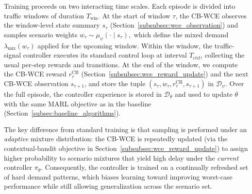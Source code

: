 \documentclass[lettersize,journal]{IEEEtran}
\begin{document}
Training proceeds on two interacting time scales. Each episode is divided into traffic windows of duration $T_{\mathrm{win}}$. At the start of window $\tau$, the CB-WCE observes the window-level state summary $s_\tau$ (Section~\ref{subsubsec:wce_observation}) and samples scenario weights
\(
w_\tau \sim \mu_{\psi}(\cdot \mid s_\tau),
\)
which define the mixed demand $\lambda_{\mathrm{mix}}(w_\tau)$ applied for the upcoming window. Within the window, the traffic-signal controller executes its standard control loop at interval $T_{\mathrm{ctrl}}$, collecting the usual per-step rewards and transitions. At the end of the window, we compute the CB-WCE reward $r^{\mathrm{CB}}_\tau$ (Section~\ref{subsubsec:wce_reward_update}) and the next CB-WCE observation $s_{\tau+1}$, and store the tuple $(s_\tau, w_\tau, r^{\mathrm{CB}}_\tau, s_{\tau+1})$ in $\mathcal{D}_\psi$. Over the full episode, the controller experience is stored in $\mathcal{D}_\theta$ and used to update $\theta$ with the same MARL objective as in the baseline (Section~\ref{subsec:baseline_algorithms}).

The key difference from standard training is that sampling is performed under an \emph{adaptive} mixture distribution: the CB-WCE is repeatedly updated (via the contextual-bandit objective in Section~\ref{subsubsec:wce_reward_update}) to assign higher probability to scenario mixtures that yield high delay under the \emph{current} controller $\pi_\theta$. Consequently, the controller is trained on a continually refreshed set of hard demand patterns, which biases learning toward improving worst-case performance while still allowing generalization across the scenario set.




\end{document}
